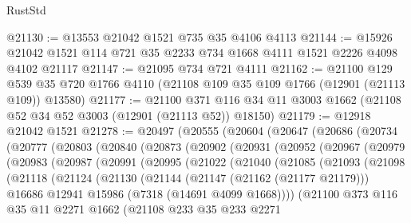 \begin{lexlean}{RustStd}
\begin{coremodule}
@21130 := @13553 @21042 @1521 @735 @35 @4106 @4113
@21144 := @15926 @21042 @1521 @114 @721 @35 @2233 @734 @1668 @4111 @1521 @2226 @4098 @4102 @21117
@21147 := @21095 @734 @721 @4111
@21162 := @21100
    @129
    @539
    @35
    @720
    @1766
    @4110
    (@21108 @109 @35 @109 @1766 (@12901 (@21113 @109)) @13580)
@21177 := @21100
    @371
    @116
    @34
    @11
    @3003
    @1662
    (@21108 @52 @34 @52 @3003 (@12901 (@21113 @52)) @18150)
@21179 := @12918 @21042 @1521
@21278 := @20497
    (@20555
      (@20604
        (@20647
          (@20686
            (@20734
              (@20777
                (@20803
                  (@20840
                    (@20873
                      (@20902
                        (@20931
                          (@20952
                            (@20967
                              (@20979
                                (@20983
                                  (@20987
                                    (@20991
                                      (@20995
                                        (@21022
                                          (@21040
                                            (@21085
                                              (@21093
                                                (@21098
                                                  (@21118
                                                    (@21124
                                                      (@21130
                                                        (@21144
                                                          (@21147 (@21162 (@21177 @21179)))
                                                          @16686
                                                          @12941
                                                          @15986
                                                          (@7318 (@14691 @4099 @1668))))
                                                      (@21100
                                                        @373
                                                        @116
                                                        @35
                                                        @11
                                                        @2271
                                                        @1662
                                                        (@21108
                                                          @233
                                                          @35
                                                          @233
                                                          @2271

\end{coremodule}
\end{lexlean}

